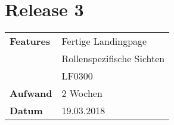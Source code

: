 
\section*{Release 3}
\label{sec:release_3}

\begin{tabular}{p{5cm} p{9cm}}
    \textbf{Features} & Fertige Landingpage \\
    & Rollenspezifische Sichten \\
    & \hspace{8pt} LF0300 \\
    \hline
    \textbf{Aufwand} & 2 Wochen \\
    \hline
    \textbf{Datum} & 19.03.2018 \\
\end{tabular}
